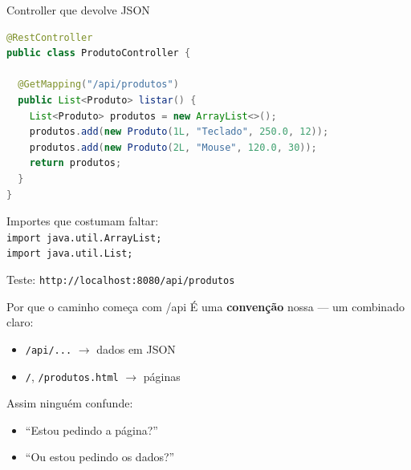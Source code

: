 \documentclass[aspectratio=169,11pt]{beamer}
\begin{document}
\begin{frame}[fragile]{Controller que devolve JSON}
\begin{lstlisting}[language=Java,basicstyle=\ttfamily\footnotesize]
@RestController
public class ProdutoController {

  @GetMapping("/api/produtos")
  public List<Produto> listar() {
    List<Produto> produtos = new ArrayList<>();
    produtos.add(new Produto(1L, "Teclado", 250.0, 12));
    produtos.add(new Produto(2L, "Mouse", 120.0, 30));
    return produtos;
  }
}
\end{lstlisting}

  \vspace{0.3em}
  Importes que costumam faltar:\\
  \texttt{import java.util.ArrayList;}\\
  \texttt{import java.util.List;}

  \vspace{0.3em}
  Teste: \texttt{http://localhost:8080/api/produtos}
\end{frame}

\begin{frame}{Por que o caminho começa com /api}
  É uma \textbf{convenção} nossa --- um combinado claro:

  \vspace{0.5em}
  \begin{itemize}
    \item \texttt{/api/...} $\rightarrow$ dados em JSON
    \item \texttt{/}, \texttt{/produtos.html} $\rightarrow$ páginas
  \end{itemize}

  \vspace{0.8em}
  Assim ninguém confunde:
  \begin{itemize}
    \item ``Estou pedindo a página?''
    \item ``Ou estou pedindo os dados?''
  \end{itemize}
\end{frame}
\end{document}
